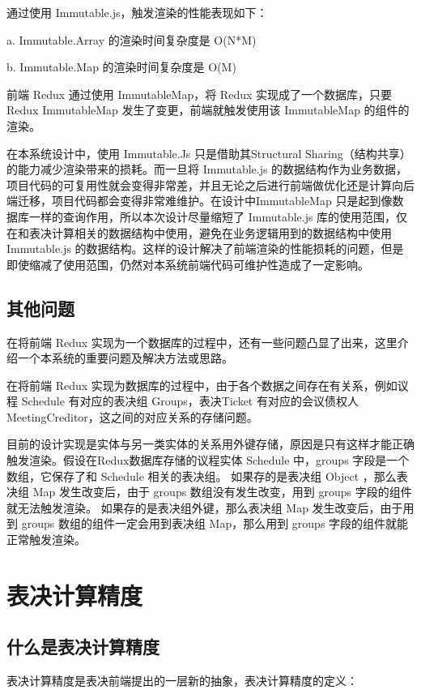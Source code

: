   通过使用 Immutable.js，触发渲染的性能表现如下：

  \quad{}a. Immutable.Array 的渲染时间复杂度是 O(N*M)

  \quad{}b. Immutable.Map 的渲染时间复杂度是 O(M)

  前端 Redux 通过使用 ImmutableMap，将 Redux 实现成了一个数据库，只要 Redux ImmutableMap 发生了变更，前端就触发使用该 ImmutableMap 的组件的渲染。

  在本系统设计中，使用 Immutable.Js 只是借助其Structural Sharing（结构共享）的能力减少渲染带来的损耗。而一旦将 Immutable.js 的数据结构作为业务数据，项目代码的可复用性就会变得非常差，并且无论之后进行前端做优化还是计算向后端迁移，项目代码都会变得非常难维护。在设计中ImmutableMap 只是起到像数据库一样的查询作用，所以本次设计尽量缩短了 Immutable.js 库的使用范围，仅在和表决计算相关的数据结构中使用，避免在业务逻辑用到的数据结构中使用 Immutable.js 的数据结构。这样的设计解决了前端渲染的性能损耗的问题，但是即使缩减了使用范围，仍然对本系统前端代码可维护性造成了一定影响。

  \subsection{其他问题}
  在将前端 Redux 实现为一个数据库的过程中，还有一些问题凸显了出来，这里介绍一个本系统的重要问题及解决方法或思路。

  在将前端 Redux 实现为数据库的过程中，由于各个数据之间存在有关系，例如议程 Schedule 有对应的表决组 Groups，表决Ticket 有对应的会议债权人 MeetingCreditor，这之间的对应关系的存储问题。

  目前的设计实现是实体与另一类实体的关系用外键存储，原因是只有这样才能正确触发渲染。假设在Redux数据库存储的议程实体 Schedule 中，groups 字段是一个数组，它保存了和 Schedule 相关的表决组。
  如果存的是表决组 Object ，那么表决组 Map 发生改变后，由于 groups 数组没有发生改变，用到 groups 字段的组件就无法触发渲染。
  如果存的是表决组外键，那么表决组 Map 发生改变后，由于用到 groups 数组的组件一定会用到表决组 Map，那么用到 groups 字段的组件就能正常触发渲染。

  \section{表决计算精度}
  \subsection{什么是表决计算精度}
  表决计算精度是表决前端提出的一层新的抽象，表决计算精度的定义：

